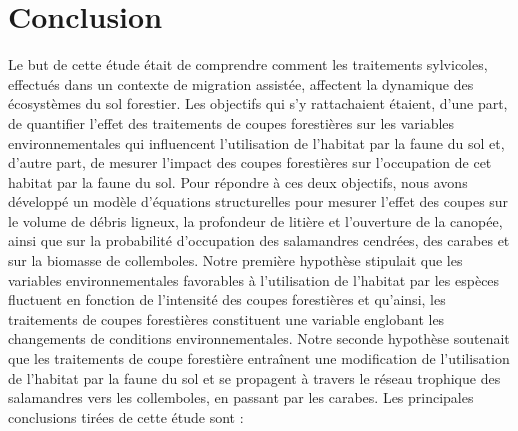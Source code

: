 \chapter*{Conclusion}           %
\label{chap-conclusion}         %


Le but de cette étude était de comprendre comment les traitements sylvicoles, effectués dans un contexte de migration assistée, affectent la dynamique des écosystèmes du sol forestier.
Les objectifs qui s’y rattachaient étaient, d'une part, de quantifier l'effet des traitements de coupes forestières sur les variables environnementales qui influencent 
l'utilisation de l'habitat par la faune du sol et, d'autre part, de mesurer l'impact des coupes forestières sur l'occupation de cet habitat par la faune du sol.
Pour répondre à ces deux objectifs, nous avons développé un modèle d'équations structurelles pour mesurer l'effet des coupes sur le volume de débris ligneux, 
la profondeur de litière et l'ouverture de la canopée, ainsi que sur la probabilité d'occupation des salamandres cendrées, des carabes et sur la biomasse de collemboles.
Notre première hypothèse stipulait que les variables environnementales favorables à l'utilisation de l'habitat par les espèces fluctuent 
en fonction de l'intensité des coupes forestières et qu'ainsi, les traitements de coupes forestières constituent une variable englobant les changements de conditions environnementales. 
Notre seconde hypothèse soutenait que les traitements de coupe forestière entraînent une modification de l'utilisation de l'habitat par la faune du sol et se propagent à travers 
le réseau trophique des salamandres vers les collemboles, en passant par les carabes. 
Les principales conclusions tirées de cette étude sont :

